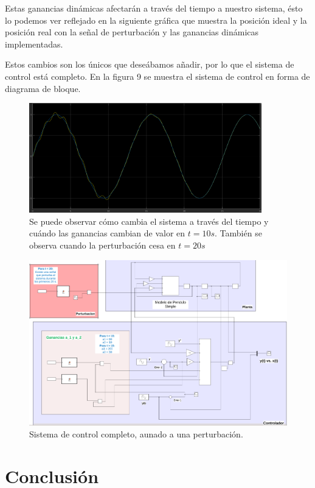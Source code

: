 \documentclass[12pt, letterpaper]{article}
\begin{document}
Estas ganancias dinámicas afectarán a través del tiempo a nuestro sistema, ésto lo podemos ver reflejado en la siguiente gráfica que muestra la posición ideal y la posición real con la señal de perturbación y las ganancias dinámicas implementadas.

Estos cambios son los únicos que deseábamos añadir, por lo que el sistema de control está completo. En la figura 9 se muestra el sistema de control en forma de diagrama de bloque.

\begin{figure}[H]
	\centering
	\includegraphics[width=0.9\textwidth]{fullsys.png}
	\caption{Se puede observar cómo cambia el sistema a través del tiempo y cuándo las ganancias cambian de valor en $t = 10 s$. También se observa cuando la perturbación cesa en $t = 20 s$}
\end{figure}


\begin{figure}[H]
	\centering
	\includegraphics[width=\textwidth]{blockfull.png}
	\caption{Sistema de control completo, aunado a una perturbación.}
\end{figure}

\section*{Conclusión}
\end{document}
